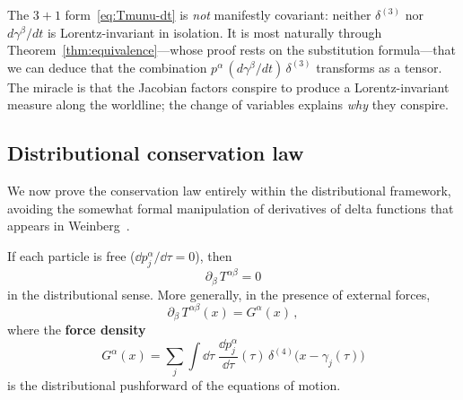 \begin{remark}
  The $3{+}1$ form~\eqref{eq:Tmunu-dt} is \emph{not} manifestly
  covariant: neither $\delta^{(3)}$ nor $d\gamma^\beta/dt$ is
  Lorentz-invariant in isolation.  It is most naturally through
  Theorem~\ref{thm:equivalence}---whose proof rests on the
  substitution formula---that we can deduce that the combination
  $p^\alpha\,(d\gamma^\beta/dt)\,\delta^{(3)}$ transforms as a
  tensor.  The miracle is that the Jacobian factors conspire to
  produce a Lorentz-invariant measure along the worldline; the
  change of variables explains \emph{why} they conspire.
\end{remark}

\subsection{Distributional conservation law}\label{sec:conservation-add}

We now prove the conservation law entirely within the
distributional framework, avoiding the somewhat formal manipulation
of derivatives of delta functions that appears in
Weinberg~\cite[\S2.8]{Weinberg72}.

\begin{theorem}%
\label{thm:conservation}
  If each particle is free ($\dd p_j^\alpha/\dd\tau = 0$), then
  \begin{equation}\label{eq:conservation}
    \partial_\beta\, T^{\alpha\beta} = 0
  \end{equation}
  in the distributional sense.  More generally, in the presence of
  external forces,
  \begin{equation}\label{eq:conservation-force}
    \partial_\beta\, T^{\alpha\beta}(x) = G^\alpha(x)\,,
  \end{equation}
  where the \textbf{force density}
  \[
    G^\alpha(x) = \sum_j \int\!\dd\tau\;
      \frac{\dd p_j^\alpha}{\dd\tau}(\tau)\,
      \delta^{(4)}\!\bigl(x - \gamma_j(\tau)\bigr)
  \]
  is the distributional pushforward of the equations of motion.
\end{theorem}

